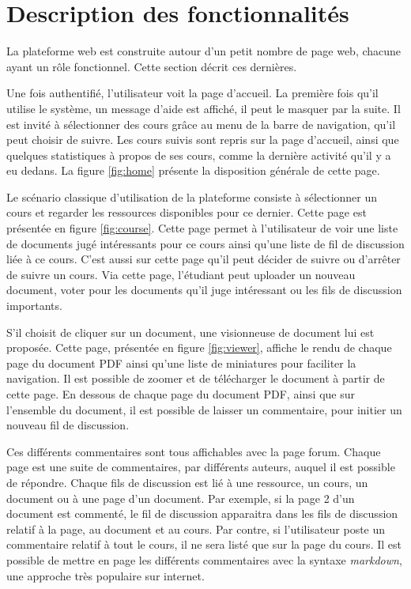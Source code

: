 \documentclass[a4paper,12pt]{article}
\begin{document}
\section{Description des fonctionnalités}

La plateforme web est construite autour d'un petit nombre de page web, chacune
ayant un rôle fonctionnel. Cette section décrit ces dernières.

Une fois authentifié, l'utilisateur voit la page d'accueil. La première fois qu'il
utilise le système, un message d'aide est affiché, il peut le masquer par la suite.
Il est invité à sélectionner des cours grâce au menu de la barre de navigation,
qu'il peut choisir de suivre. Les cours suivis sont repris sur la page d'accueil, ainsi
que quelques statistiques à propos de ses cours, comme la dernière activité qu'il y
a eu dedans. La figure \ref{fig:home} présente la disposition générale de cette page.

Le scénario classique d'utilisation de la plateforme consiste à sélectionner un cours
et regarder les ressources disponibles pour ce dernier. Cette page est présentée en
figure \ref{fig:course}. Cette page permet à l'utilisateur de voir une liste de documents
jugé intéressants pour ce cours ainsi qu'une liste de fil de discussion liée à ce cours.
C'est aussi sur cette page qu'il peut décider de suivre ou d'arrêter de suivre un cours.
Via cette page, l'étudiant peut uploader un nouveau document, voter pour les documents
qu'il juge intéressant ou les fils de discussion importants.

S'il choisit de cliquer sur un document, une visionneuse de document lui est proposée.
Cette page, présentée en figure \ref{fig:viewer}, affiche le rendu de chaque page
du document PDF ainsi qu'une liste de miniatures pour faciliter la navigation. Il
est possible de zoomer et de télécharger le document à partir de cette page. En
dessous de chaque page du document PDF, ainsi que sur l'ensemble du document, il
est possible de laisser un commentaire, pour initier un nouveau fil de discussion.

Ces différents commentaires sont tous affichables avec la page forum. Chaque page
est une suite de commentaires, par différents auteurs, auquel il est possible
de répondre. Chaque fils de discussion est lié à une ressource, un cours, un
document ou à une page d'un document. Par exemple, si la page 2 d'un document
est commenté, le fil de discussion apparaitra dans les fils de discussion
relatif à la page, au document et au cours. Par contre, si l'utilisateur
poste un commentaire relatif à tout le cours, il ne sera listé que sur la page
du cours. Il est possible de mettre en page les différents commentaires avec la syntaxe
\textit{markdown}, une approche très populaire sur internet.
\end{document}
